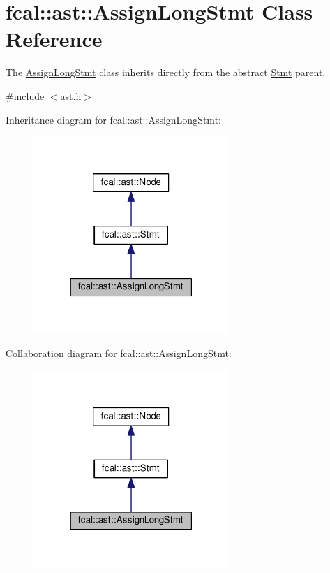 \hypertarget{classfcal_1_1ast_1_1AssignLongStmt}{}\section{fcal\+:\+:ast\+:\+:Assign\+Long\+Stmt Class Reference}
\label{classfcal_1_1ast_1_1AssignLongStmt}


The \hyperlink{classfcal_1_1ast_1_1AssignLongStmt}{Assign\+Long\+Stmt} class inherits directly from the abstract \hyperlink{classfcal_1_1ast_1_1Stmt}{Stmt} parent.  




{\ttfamily \#include $<$ast.\+h$>$}



Inheritance diagram for fcal\+:\+:ast\+:\+:Assign\+Long\+Stmt\+:
\nopagebreak
\begin{figure}[H]
\begin{center}
\leavevmode
\includegraphics[width=210pt]{classfcal_1_1ast_1_1AssignLongStmt__inherit__graph}
\end{center}
\end{figure}


Collaboration diagram for fcal\+:\+:ast\+:\+:Assign\+Long\+Stmt\+:
\nopagebreak
\begin{figure}[H]
\begin{center}
\leavevmode
\includegraphics[width=210pt]{classfcal_1_1ast_1_1AssignLongStmt__coll__graph}
\end{center}
\end{figure}
